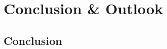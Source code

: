 \chapter{Conclusion \& Outlook}\label{ch:conclusion-outlook}

\section{Conclusion}\label{sec:conclusion}





